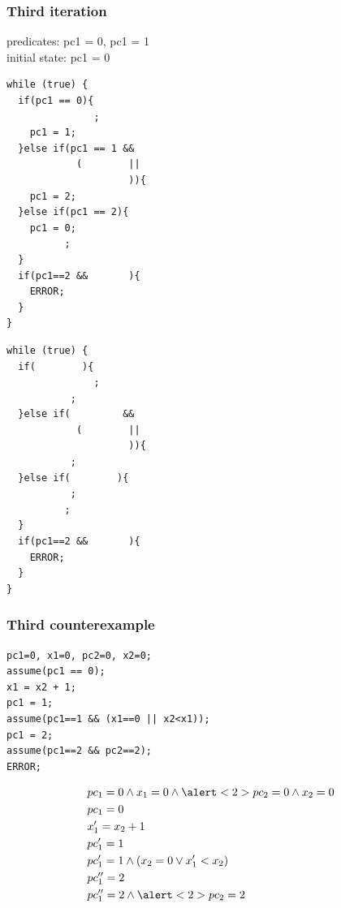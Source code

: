 \documentclass{beamer}
\begin{document}
\begin{frame}[fragile]
  \frametitle{Third iteration}

{\footnotesize
predicates: pc1 = 0, pc1 = 1\\
initial state: pc1 = 0
}
\vfill
\begin{minipage}{0.45\linewidth}
\begin{lstlisting}
while (true) {
  if(pc1 == 0){
               ;
    pc1 = 1;
  }else if(pc1 == 1 &&
            (        ||
                     )){
    pc1 = 2;
  }else if(pc1 == 2){
    pc1 = 0;
          ;
  }
  if(pc1==2 &&       ){
    ERROR;
  }
}
\end{lstlisting}
\end{minipage}
\hfill
\begin{minipage}{0.45\linewidth}
\begin{lstlisting}
while (true) {
  if(        ){
               ;
           ;
  }else if(         &&
            (        ||
                     )){
           ;
  }else if(        ){
           ;
          ;
  }
  if(pc1==2 &&       ){
    ERROR;
  }
}
\end{lstlisting}
\end{minipage}

\end{frame}

\begin{frame}[fragile]
  \frametitle{Third counterexample}
\begin{minipage}{0.65\linewidth}
\begin{lstlisting}[numbers=none]
pc1=0, x1=0, pc2=0, x2=0;
assume(pc1 == 0);
x1 = x2 + 1;
pc1 = 1;
assume(pc1==1 && (x1==0 || x2<x1));
pc1 = 2;
assume(pc1==2 && pc2==2);
ERROR;
\end{lstlisting}
\end{minipage}
\begin{minipage}{0.8\linewidth}
\begin{align*}
& pc_1=0 \land x_1=0 \land \alert<2>{pc_2=0} \land x_2=0 \\
& pc_1=0 \\
& x_1' = x_2 + 1 \\
& pc_1' = 1 \\
& pc_1'=1 \land (x_2=0 \lor x_1'<x_2) \\
& pc_1'' = 2 \\
& pc_1''=2 \land \alert<2>{pc_2=2}
\end{align*}
\end{minipage}
\end{frame}
\end{document}
